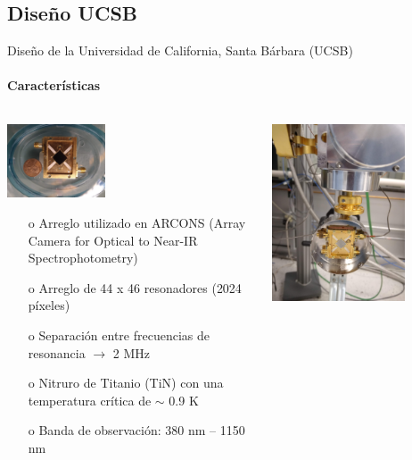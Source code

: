 \documentclass[ignorenonframetext,12pt]{beamer}
\begin{document}
\subsection{Diseño UCSB}
\begin{frame}{Diseño de la Universidad de California, Santa Bárbara (UCSB)}
				\framesubtitle{Características}
				\begin{columns}
								\begin{column}{0.49\textwidth}
												\includegraphics[width=0.4\textwidth]{mkid4}
												\begin{itemize}
																\item[o] Arreglo utilizado en ARCONS (Array
																				Camera for Optical to Near-IR
																				Spectrophotometry)
																\item[o] Arreglo de 44 x 46 resonadores (\alert{2024
																				píxeles})
																\item[o] Separación entre frecuencias de
																				resonancia $\to$ \alert{2 MHz}
																\item[o] Nitruro de Titanio (TiN) con una temperatura
																				crítica de \alert{$\sim$ 0.9 K}
																\item[o] Banda de observación: \alert{380 nm --
																				1150 nm}
												\end{itemize}
								\end{column}
								\begin{column}{0.49\textwidth}
												\centering
												\includegraphics[angle=-90,width=0.72\textwidth]{mkid2}

\end{column}
\end{columns}
\end{frame}
\end{document}
